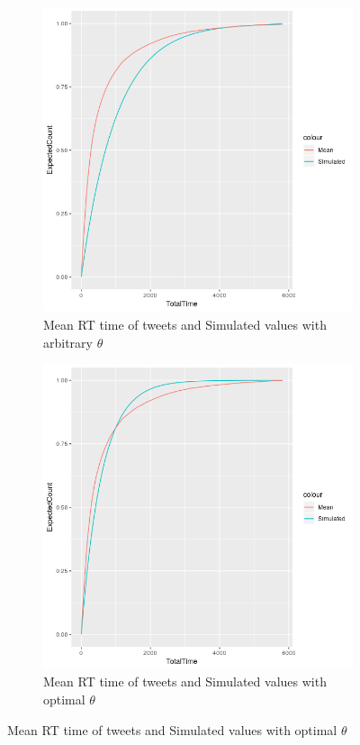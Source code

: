 \begin{figure}[H]
	\centering
	\begin{subfigure}{.4\textwidth}
	  \centering
	  \includegraphics[width=0.9\linewidth]{./Figures/non_optimal.png}
	  \caption{Mean RT time of tweets and Simulated values with arbitrary $\theta$}
	  \label{fig:sub1}
	\end{subfigure}%
	\begin{subfigure}{.4\textwidth}
	  \centering
	  \includegraphics[width=1\linewidth]{./Figures/optimal.png}
	  \caption{Mean RT time of tweets and Simulated values with optimal $\theta$}
	  \label{fig:sub2}
	\end{subfigure}
\end{figure}

